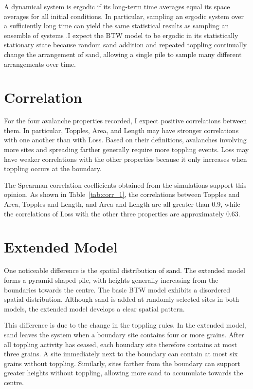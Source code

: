 A dynamical system is ergodic if its long-term time averages equal its space averages for all initial conditions. In particular, sampling an ergodic system over a sufficiently long time can yield the same statistical results as sampling an ensemble of systems \cite{Frigg_Werndl_2024}.I expect the BTW model to be ergodic in its statistically stationary state because random sand addition and repeated toppling continually change the arrangement of sand, allowing a single pile to sample many different arrangements over time.

\section{Correlation}

For the four avalanche properties recorded, I expect positive correlations between them. In particular, Topples, Area, and Length may have stronger correlations with one another than with Loss. Based on their definitions, avalanches involving more sites and spreading farther generally require more toppling events. Loss may have weaker correlations with the other properties because it only increases when toppling occurs at the boundary.

The Spearman correlation coefficients obtained from the simulations support this opinion. As shown in Table~\ref{tab:corr_1}, the correlations between Topples and Area, Topples and Length, and Area and Length are all greater than 0.9, while the correlations of Loss with the other three properties are approximately 0.63.


\section{Extended Model}

One noticeable difference is the spatial distribution of sand. The extended model forms a pyramid-shaped pile, with heights generally increasing from the boundaries towards the centre. The basic BTW model exhibits a disordered spatial distribution. Although sand is added at randomly selected sites in both models, the extended model develops a clear spatial pattern.

This difference is due to the change in the toppling rules. In the extended model, sand leaves the system when a boundary site contains four or more grains. After all toppling activity has ceased, each boundary site therefore contains at most three grains. A site immediately next to the boundary can contain at most six grains without toppling. Similarly, sites farther from the boundary can support greater heights without toppling, allowing more sand to accumulate towards the centre.

